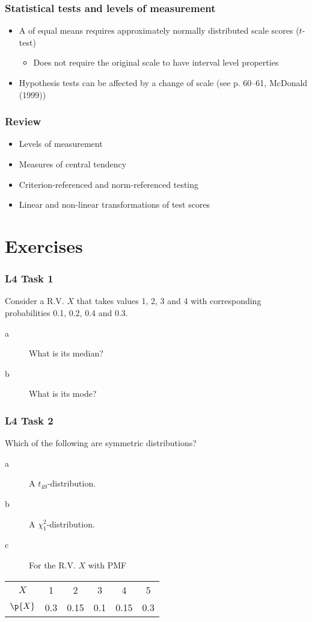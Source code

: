 \documentclass[compress]{beamer}\usepackage[]{graphicx}\usepackage[]{xcolor}
\begin{document}
\begin{frame}[fragile]
  \frametitle{Statistical tests and levels of measurement}
    \begin{itemize}
      \item A  of equal means requires approximately normally distributed scale scores ($t$-test)
      \begin{itemize}
        \item Does not require the original scale to have interval level properties
      \end{itemize}
      \item Hypothesis tests can be affected by a change of scale (see p. 60--61, McDonald (1999))
    \end{itemize}
\end{frame}

\begin{frame}[fragile]
  \frametitle{Review}
    \begin{itemize}
      \item Levels of measurement
      \item Measures of central tendency
      \item Criterion-referenced and norm-referenced testing
      \item Linear and non-linear transformations of test scores
    \end{itemize}
\end{frame}


\section{Exercises}

\begin{frame}[fragile]
  \frametitle{L4 Task 1}
    Consider a R.V. $X$ that takes values 1, 2, 3 and 4 with corresponding probabilities 0.1, 0.2, 0.4 and 0.3.
    \begin{description}
      \item[a] What is its median?
      \item[b] What is its mode?
    \end{description}
\end{frame}

\begin{frame}[fragile]
  \frametitle{L4 Task 2}
    Which of the following are symmetric distributions?
    \begin{description}
      \item[a] A $t_{49}$-distribution.
      \item[b] A $\chi_1^2$-distribution.
      \item[c] For the R.V. $X$ with PMF
    \end{description}
    \begin{center}
      \begin{tabular}{cccccc}
        \hline
        $X$ &1  &2  &3  &4  &5\\
        $\p{X}$ &0.3  &0.15  &0.1  &0.15  &0.3\\
        \hline
      \end{tabular}
    \end{center}
\end{frame}
\end{document}
